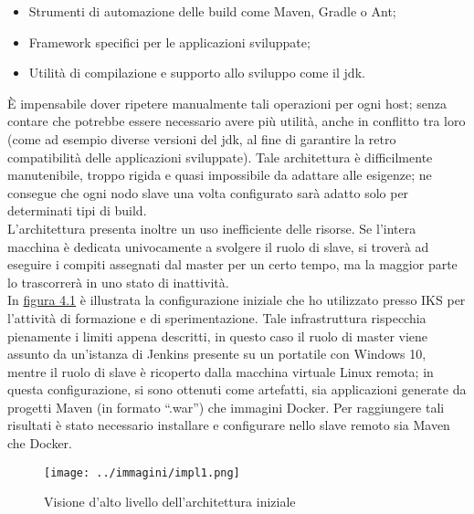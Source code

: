\begin{itemize}
    \item Strumenti di automazione delle \gls{build} come Maven, Gradle o Ant; 
    \item Framework specifici per le applicazioni sviluppate;
    \item Utilità di compilazione e supporto allo sviluppo come il \gls{jdk}.
\end{itemize}

\`E impensabile dover ripetere manualmente tali operazioni per ogni \gls{host}; senza contare che potrebbe essere necessario avere più utilità, anche in conflitto tra loro (come ad esempio diverse versioni del \gls{jdk}, al fine di garantire la retro compatibilità delle applicazioni sviluppate). Tale architettura è difficilmente manutenibile, troppo rigida e quasi impossibile da adattare alle esigenze; ne consegue che ogni nodo slave una volta configurato sarà adatto solo per determinati tipi di \gls{build}.\\

L'architettura presenta inoltre un uso inefficiente delle risorse. Se l'intera macchina è dedicata univocamente a svolgere il ruolo di \gls{slave}, si troverà ad eseguire i compiti assegnati dal \gls{master} per un certo tempo, ma la maggior parte lo trascorrerà in uno stato di inattività. \\

In \hyperref[fig:impl1]{figura 4.1} è illustrata la configurazione iniziale che ho utilizzato presso IKS per l'attività di formazione e di sperimentazione. Tale infrastruttura rispecchia pienamente i limiti appena descritti, in questo caso il ruolo di \gls{master} viene assunto da un'istanza di Jenkins presente su un portatile con Windows 10, mentre il ruolo di \gls{slave} è ricoperto dalla macchina virtuale \gls{Linux} remota; in questa configurazione, si sono ottenuti come artefatti, sia applicazioni generate da progetti Maven (in formato ``.\gls{war}'') che immagini Docker. Per raggiungere tali risultati è stato necessario installare e configurare nello slave remoto sia Maven che Docker.

\begin{figure}[H]
    \capstart
    \centering
    \texttt{[image: ../immagini/impl1.png]}
    \caption{Visione d'alto livello dell'architettura iniziale}
    \label{fig:impl1}
\end{figure}

